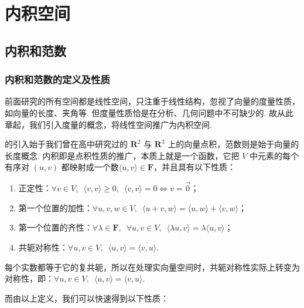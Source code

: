 \chapter{内积空间}

\section{内积和范数}

\subsection{内积和范数的定义及性质}

前面研究的所有空间都是线性空间，只注重于线性结构，忽视了向量的度量性质，如向量的长度、夹角等. 但度量性质恰是在分析、几何问题中不可缺少的. 故从此章起，我们引入度量的概念，将线性空间推广为内积空间.

的引入始于我们曾在高中研究过的 $\mathbf{R}^{2}$ 与 $\mathbf{R}^{3}$ 上的向量点积，范数则是始于向量的长度概念. 内积即是点积性质的推广，本质上就是一个函数，它把 $ V $ 中元素的每个有序对 $(u, v)$ 都映射成一个数$ \langle u, v \rangle \in \mathbf{F}$，并且具有以下性质：

\begin{enumerate}
    \item 正定性：$\forall v \in V, \enspace \langle v, v \rangle \geqslant 0, \enspace \langle v, v \rangle = 0 \iff v = \vec{0}$；

    \item 第一个位置的加性：$\forall u, v, w \in V, \enspace \langle u + v, w \rangle = \langle u, w \rangle + \langle v, w \rangle$；

    \item 第一个位置的齐性：$\forall \lambda \in \mathbf{F}, \enspace \forall u, v \in V, \enspace \langle \lambda u, v \rangle = \lambda \langle u, v \rangle$；

    \item 共轭对称性：$\forall u, v \in V, \enspace \langle u, v \rangle = \overline{\langle v, u \rangle}$.
\end{enumerate}

每个实数都等于它的复共轭，所以在处理实向量空间时，共轭对称性实际上转变为对称性，即：$\forall u, v \in V, \enspace \langle u, v \rangle = \langle v, u \rangle$.

而由以上定义，我们可以快速得到以下性质：

